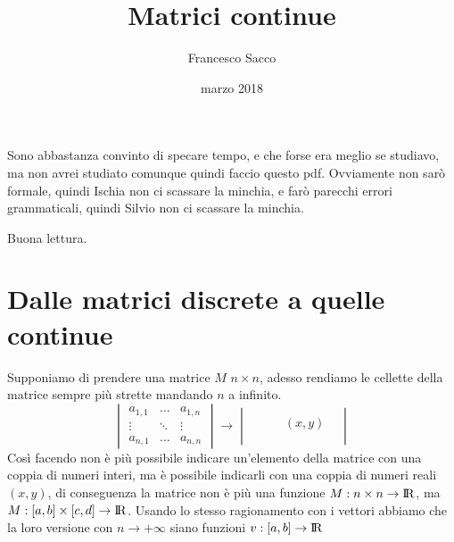 \documentclass[11pt,a4paper]{article}
\date{marzo 2018}
\title{Matrici continue}
\author{Francesco Sacco}
\theoremstyle{definition}
\theoremstyle{plain}
\theoremstyle{plain}
\begin{document}
	\maketitle
		Sono abbastanza convinto di specare tempo, e che forse era meglio se studiavo, ma non avrei studiato comunque quindi faccio questo pdf.\newline
		Ovviamente non sarò formale, quindi Ischia non ci scassare la minchia, e farò parecchi errori grammaticali, quindi Silvio non ci scassare la minchia.\newline

		Buona lettura.
		

		\section{Dalle matrici discrete a quelle continue}
			Supponiamo di prendere una matrice $M$ $ n \times n$, adesso rendiamo le cellette della matrice sempre più strette mandando $n$ a infinito.
			\begin{equation}
				\begin{vmatrix}
					a_{1,1} & \dots & a_{1,n} \\
					\vdots	&	\ddots&	\vdots	\\
					a_{n,1} & \dots & a_{n,n} 
				\end{vmatrix}
				\longrightarrow
				\begin{vmatrix}
					&\quad & & \\
					& & (x,y) & \\
					& & & \\
				\end{vmatrix}
			\end{equation}
			Così facendo non è più possibile indicare un'elemento della matrice con una coppia di numeri interi, ma è possibile indicarli con una coppia di numeri reali $(x,y)$, di  conseguenza la matrice non è più una funzione $M:n\times n \rightarrow \rm I\!R$, ma $M:[a,b]\times [c,d]\rightarrow \rm I\!R$.\newline
			Usando lo stesso ragionamento con i vettori abbiamo che la loro versione con $n\rightarrow +\infty$ siano funzioni $v:[a,b]\rightarrow \rm I\!R$ 
		
\end{document}
